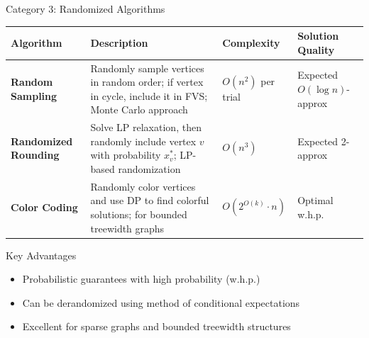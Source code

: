 \documentclass[aspectratio=169]{beamer}
\begin{document}
\begin{frame}{Category 3: Randomized Algorithms}
	\begin{table}
		\tiny
		\begin{tabular}{@{}p{3.5cm}p{6cm}p{2cm}p{1.8cm}@{}}
			\toprule
			\textbf{Algorithm}                                                                                     & \textbf{Description} & \textbf{Complexity} & \textbf{Solution Quality} \\
			\midrule

			\textbf{Random Sampling}                                                                               &
			Randomly sample vertices in random order; if vertex in cycle, include it in FVS; Monte Carlo approach  &
			$O(n^2)$ per trial                                                                                     &
			Expected $O(\log n)$-approx                                                                                                                                                     \\
			\midrule

			\textbf{Randomized Rounding}                                                                           &
			Solve LP relaxation, then randomly include vertex $v$ with probability $x_v^*$; LP-based randomization &
			$O(n^3)$                                                                                               &
			Expected 2-approx                                                                                                                                                               \\
			\midrule

			\textbf{Color Coding}                                                                                  &
			Randomly color vertices and use DP to find colorful solutions; for bounded treewidth graphs            &
			$O(2^{O(k)} \cdot n)$                                                                                  &
			Optimal w.h.p.                                                                                                                                                                  \\

			\bottomrule
		\end{tabular}
	\end{table}

	\vspace{0.3cm}
	\footnotesize
	\begin{block}{Key Advantages}
		\begin{itemize}
			\item Probabilistic guarantees with high probability (w.h.p.)
			\item Can be derandomized using method of conditional expectations
			\item Excellent for sparse graphs and bounded treewidth structures
		\end{itemize}
	\end{block}
\end{frame}
\end{document}
